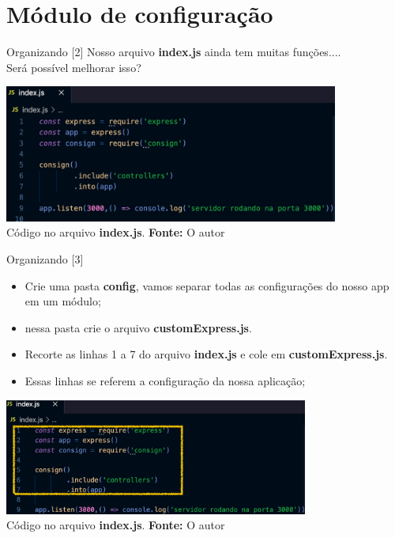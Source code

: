 \documentclass{beamer}
\begin{document}
 \section{Módulo de configuração}
    \begin{frame}{Organizando [2]}
	Nosso arquivo \textbf{index.js} ainda tem muitas funções....\\
	Será possível melhorar isso?
        
         \begin{center}
    	\includegraphics[width=110mm]{resources/aula4_8.png}\\
        \tiny{ Código no arquivo \textbf{index.js}. \textbf{Fonte:} O autor}
     \end{center}   
    \end{frame}
    \begin{frame}{Organizando [3]}
	\begin{itemize}
		\item Crie uma pasta \textbf{config}, vamos separar todas as configurações do nosso app em um módulo;
		\item nessa pasta crie o arquivo \textbf{customExpress.js}.
		\item Recorte as linhas 1 a 7 do arquivo \textbf{index.js} e cole em \textbf{customExpress.js}.
		\item Essas linhas se referem a configuração da nossa aplicação;
	\end{itemize}
        
         \begin{center}
    	\includegraphics[width=100mm]{resources/aula4_9.png}\\
        \tiny{ Código no arquivo \textbf{index.js}. \textbf{Fonte:} O autor}
     \end{center}   
    \end{frame}
\end{document}
